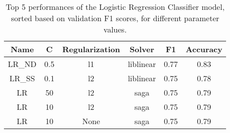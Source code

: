 \begin{table}[H]
	\centering
	\begin{tabular}{c c c c c c}
	\hline
	\hline
	\textbf{Name} & \textbf{C} & \textbf{Regularization} & \textbf{Solver} & \textbf{F1} & \textbf{Accuracy} \\ 
	\hline
	\hline
	LR\_ND & 0.5 & l1 & liblinear & 0.77 & 0.83 \\ 
	LR\_SS & 0.1 & l2 & liblinear & 0.75 & 0.78 \\ 
	LR & 50 & l2 & saga & 0.75 & 0.79 \\ 
	LR & 10 & l2 & saga & 0.75 & 0.79 \\ 
	LR & 10 & None & saga & 0.75 & 0.79 \\ 
	\hline
	\end{tabular}

	\caption{Top 5 performances of the Logistic Regression Classifier model, sorted based on validation F1 scores, for different parameter values.}
	\label{tab:lr}
\end{table}

